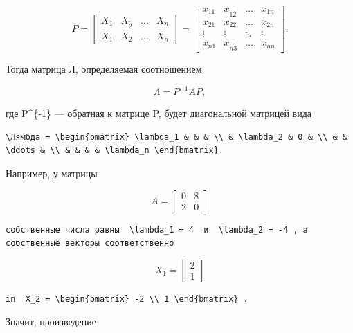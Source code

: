 \documentclass[
  ukrainian,
]{article}
\begin{document}
\[
P = \begin{bmatrix} X_1 & X_{\tilde{2}} & \dots & X_n \\ X_{1} & X_{2} & \dots & X_n \end{bmatrix} = \begin{bmatrix} x_{11} & x_{1\tilde{2}} & \dots & x_{1n} \\ x_{21} & x_{22} & \dots & x_{2n} \\ \vdots & \vdots & \ddots & \vdots \\ x_{n1} & x_{n\tilde{3}} & \dots & x_{nn} \end{bmatrix}.
\]

Тогда матрица Л, определяемая соотношением

\[
\Lambda = P^{-1}AP,
\]

где P\^{}\{-1\} --- обратная к матрице P, будет диагональной матрицей
вида

\begin{verbatim}
\Лямбда = \begin{bmatrix} \lambda_1 & & & \\ & \lambda_2 & 0 & \\ & & \ddots & \\ & & & & \lambda_n \end{bmatrix}.
\end{verbatim}

Например, у матрицы

\[
A = \begin{bmatrix} 0 & 8 \\ 2 & 0 \end{bmatrix}
\]

\begin{verbatim}
собственные числа равны  \lambda_1 = 4  и  \lambda_2 = -4 , а собственные векторы соответственно
\end{verbatim}

\[
X_1 = \begin{bmatrix} 2 \\ 1 \end{bmatrix}
\]

\begin{verbatim}
in  X_2 = \begin{bmatrix} -2 \\ 1 \end{bmatrix} .
\end{verbatim}

Значит, произведение
\end{document}
